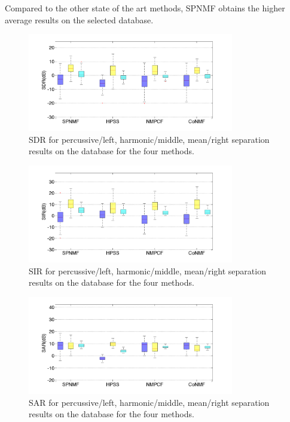 \documentclass[journal]{IEEEtran}
\begin{document}
Compared to the other state of the art methods, SPNMF obtains the higher average results on the selected database. 


\begin{figure}[h]

  \centering 
  \includegraphics[width=9cm]{fig/DatabaseSDR.png}
  \caption{\label{DatabaseSDR} SDR for percussive/left, harmonic/middle, mean/right separation results on the database for the four methods.}
  
\end{figure}

\begin{figure}[h]

  \centering 
  \includegraphics[width=9cm]{fig/DatabaseSIR.png}
  \caption{\label{DatabaseSIR} SIR for percussive/left, harmonic/middle, mean/right separation results on the database for the four methods.}
  
\end{figure}

\begin{figure}[h]

  \centering 
  \includegraphics[width=9cm]{fig/DatabaseSAR.png}
  \caption{\label{DatabaseSAR} SAR for percussive/left, harmonic/middle, mean/right separation results on the database for the four methods.}
  
\end{figure}
\end{document}
